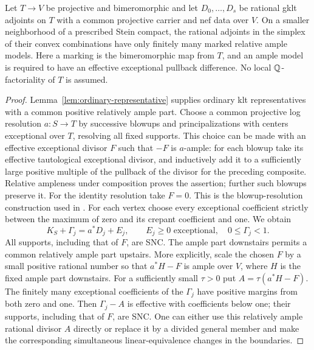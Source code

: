 \begin{lemma}\label{lem:marked-models}
Let $T\to V$ be projective and bimeromorphic and let
$D_0,\ldots,D_s$ be rational gklt adjoints on $T$ with a common
projective carrier and nef data over $V$.  On a smaller neighborhood
of a prescribed Stein compact, the rational adjoints in the simplex
of their convex combinations have only finitely many marked relative
ample models.  Here a marking is the bimeromorphic map from $T$,
and an ample model is required to have an effective exceptional
pullback difference.  No local $\mathbb Q$-factoriality of $T$ is assumed.
\end{lemma}

\begin{proof}
Lemma~\ref{lem:ordinary-representative} supplies ordinary klt
representatives with a common positive relatively ample part.
Choose a common projective log resolution $a\colon S\to T$ by
successive blowups and principalizations with centers exceptional over
$T$, resolving all fixed supports.  This choice can be made with an
effective exceptional divisor $F$ such that $-F$ is $a$-ample:
for each blowup take its effective tautological exceptional divisor,
and inductively add it to a sufficiently large positive multiple of the
pullback of the divisor for the preceding composite.  Relative
ampleness under composition proves the assertion; further such blowups
preserve it.  For the identity resolution take $F=0$.
This is the blowup-resolution construction used in
\cite[Theorem~2.13, Remark~2.14, and the proof of Corollary~3.7]{DHP2024}.
For each vertex choose every exceptional coefficient strictly between
the maximum of zero and its crepant coefficient and one.  We obtain
\[
 K_S+\Gamma_j=a^*D_j+E_j,
 \qquad E_j\geq0\text{ exceptional},\quad
 0\leq\Gamma_j<1.
\]
All supports, including that of $F$, are SNC.  The ample
part downstairs permits a common relatively ample part upstairs.
More explicitly, scale the chosen $F$ by a small positive rational number so that
$a^*H-F$ is ample over $V$, where $H$ is the fixed ample part
downstairs.  For a sufficiently small $\tau>0$ put
$A=\tau(a^*H-F)$.  The finitely many exceptional coefficients of the
$\Gamma_j$ have positive margins from both zero and one.  Then
$\Gamma_j-A$ is effective with coefficients below one; their
supports, including that of $F$, are SNC.  One can either use this
relatively ample rational divisor $A$ directly or replace it by a
divided general member and make the corresponding simultaneous
linear-equivalence changes in the boundaries.


\end{proof}
